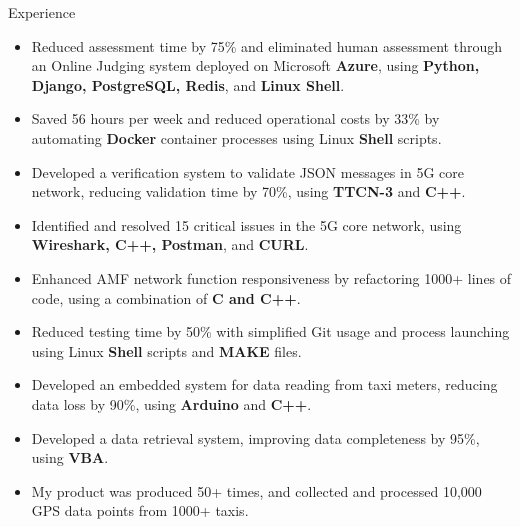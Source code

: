 \documentclass{resume} %
\begin{document}
\begin{workSection}{Experience}
      \experienceItem[
      company=CodePro Education,
      location=Taichung{,} TW,
      position=Software Engineer,
      duration=Dec. 2019 – Dec. 2020
      ]
      \vspace{-0.65em}
      \begin{itemize}
            \itemsep -6pt {}
            \item Reduced assessment time by 75\% and eliminated human assessment through an Online Judging system deployed on Microsoft \textbf{Azure}, using \textbf{Python, Django, PostgreSQL, Redis}, and \textbf{Linux Shell}.
            \item Saved 56 hours per week and reduced operational costs by 33\% by automating \textbf{Docker} container processes using Linux \textbf{Shell} scripts.
      \end{itemize}

      \experienceItem[
      company=Free5gc department of NCTU,
      location=Hsinchu{,} TW,
      position=Back End Engineer,
      duration=Jul. 2019 – Nov. 2019
      ]
      \vspace{-0.65em}
      \begin{itemize}
            \itemsep -6pt {}
            \item Developed a verification system to validate JSON messages in 5G core network, reducing validation time by 70\%, using \textbf{TTCN-3} and \textbf{C++}.
            \item Identified and resolved 15 critical issues in the 5G core network, using \textbf{Wireshark, C++, Postman}, and \textbf{CURL}.
            \item Enhanced AMF network function responsiveness by refactoring 1000+ lines of code, using a combination of \textbf{C and C++}.
            \item Reduced testing time by 50\% with simplified Git usage and process launching using Linux \textbf{Shell} scripts and \textbf{MAKE} files.
      \end{itemize}

      \experienceItem[
      company=Ministry of Transportation and Communications TW \& NCTU,
      location=Taipei{,} TW,
      position=Embedded System Engineer,
      duration=June 2016 – Sep. 2016
      ]
      \vspace{-0.65em}
      \begin{itemize}
            \itemsep -6pt {}
            \item Developed an embedded system for data reading from taxi meters, reducing data loss by 90\%, using \textbf{Arduino} and \textbf{C++}.
            \item Developed a data retrieval system, improving data completeness by 95\%, using \textbf{VBA}.
            \item My product was produced 50+ times, and collected and processed 10,000 GPS data points from 1000+ taxis.
      \end{itemize}

\end{workSection}

\education{
\educationItem[
university=National Chiao Tung University (NCTU),
location=Hsinchu{,} TW,
program=B.S.{,} Computer Science,
graduation=2018
]
}
\end{document}
